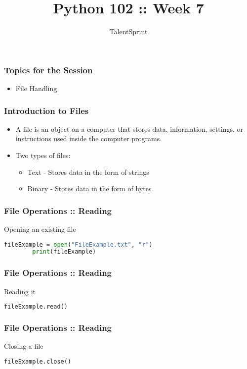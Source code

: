 \documentclass[14pt]{beamer}
\title{Python 102 :: Week 7}
\date{}
\author[TS]{TalentSprint}
\begin{document}
    \begin{frame}
        \titlepage
    \end{frame}
    \begin{frame}
        \frametitle{Topics for the Session}
        \begin{itemize}
            \item File Handling
        \end{itemize}
    \end{frame}
    \begin{frame}
        \frametitle{Introduction to Files}
        \begin{itemize}
            \item A file is an object on a computer that stores data, information, settings, or instructions used inside the computer programs.
            \item Two types of files:
                \begin{itemize}
                    \item Text - Stores data in the form of strings
                    \item Binary - Stores data in the form of bytes 
                \end{itemize}
        \end{itemize}
    \end{frame}
    \begin{frame}[containsverbatim]
        \frametitle{File Operations :: Reading}
        \alert{Opening an existing file}
        \begin{lstlisting}[language=Python]
        fileExample = open("FileExample.txt", "r")
        print(fileExample)
        \end{lstlisting}
    \end{frame}
    \begin{frame}[containsverbatim]
        \frametitle{File Operations :: Reading}
        \alert{Reading it}
        \begin{lstlisting}[language=Python]
        fileExample.read()
        \end{lstlisting}
    \end{frame}
    \begin{frame}[containsverbatim]
        \frametitle{File Operations :: Reading}
        \alert{Closing a file}
        \begin{lstlisting}[language=Python]
            fileExample.close()
        \end{lstlisting}
    \end{frame}
\end{document}
